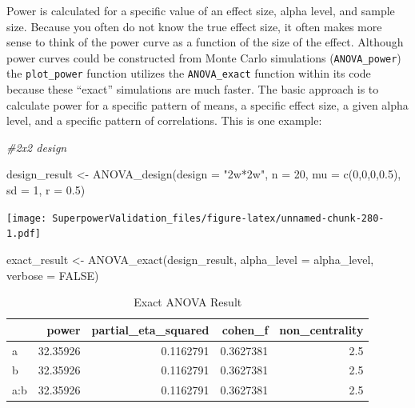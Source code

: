\documentclass[
]{book}
\newenvironment{Shaded}{\begin{snugshade}}{\end{snugshade}}
\newcommand{\AttributeTok}[1]{\textcolor[rgb]{0.77,0.63,0.00}{#1}}
\newcommand{\CommentTok}[1]{\textcolor[rgb]{0.56,0.35,0.01}{\textit{#1}}}
\newcommand{\ConstantTok}[1]{\textcolor[rgb]{0.00,0.00,0.00}{#1}}
\newcommand{\DecValTok}[1]{\textcolor[rgb]{0.00,0.00,0.81}{#1}}
\newcommand{\FloatTok}[1]{\textcolor[rgb]{0.00,0.00,0.81}{#1}}
\newcommand{\FunctionTok}[1]{\textcolor[rgb]{0.00,0.00,0.00}{#1}}
\newcommand{\NormalTok}[1]{#1}
\newcommand{\OtherTok}[1]{\textcolor[rgb]{0.56,0.35,0.01}{#1}}
\newcommand{\StringTok}[1]{\textcolor[rgb]{0.31,0.60,0.02}{#1}}
\begin{document}
Power is calculated for a specific value of an effect size, alpha level, and sample size. Because you often do not know the true effect size, it often makes more sense to think of the power curve as a function of the size of the effect. Although power curves could be constructed from Monte Carlo simulations (\texttt{ANOVA\_power}) the \texttt{plot\_power} function utilizes the \texttt{ANOVA\_exact} function within its code because these ``exact'' simulations are much faster. The basic approach is to calculate power for a specific pattern of means, a specific effect size, a given alpha level, and a specific pattern of correlations. This is one example:

\begin{Shaded}
\begin{Highlighting}[]
\CommentTok{\#2x2 design}

\NormalTok{design\_result }\OtherTok{\textless{}{-}} \FunctionTok{ANOVA\_design}\NormalTok{(}\AttributeTok{design =} \StringTok{"2w*2w"}\NormalTok{,}
                              \AttributeTok{n =} \DecValTok{20}\NormalTok{, }
                              \AttributeTok{mu =} \FunctionTok{c}\NormalTok{(}\DecValTok{0}\NormalTok{,}\DecValTok{0}\NormalTok{,}\DecValTok{0}\NormalTok{,}\FloatTok{0.5}\NormalTok{), }
                              \AttributeTok{sd =} \DecValTok{1}\NormalTok{, }
                              \AttributeTok{r =} \FloatTok{0.5}\NormalTok{)}
\end{Highlighting}
\end{Shaded}

\texttt{[image: SuperpowerValidation\_files/figure-latex/unnamed-chunk-280-1.pdf]}

\begin{Shaded}
\begin{Highlighting}[]
\NormalTok{exact\_result }\OtherTok{\textless{}{-}} \FunctionTok{ANOVA\_exact}\NormalTok{(design\_result,}
                            \AttributeTok{alpha\_level =}\NormalTok{ alpha\_level,}
                            \AttributeTok{verbose =} \ConstantTok{FALSE}\NormalTok{)}
\end{Highlighting}
\end{Shaded}

\begin{table}[!h]

\caption{\label{tab:unnamed-chunk-281}Exact ANOVA Result}
\centering
\begin{tabular}[t]{l|r|r|r|r}
\hline
  & power & partial\_eta\_squared & cohen\_f & non\_centrality\\
\hline
a & 32.35926 & 0.1162791 & 0.3627381 & 2.5\\
\hline
b & 32.35926 & 0.1162791 & 0.3627381 & 2.5\\
\hline
a:b & 32.35926 & 0.1162791 & 0.3627381 & 2.5\\
\hline
\end{tabular}
\end{table}
\pagebreak
\end{document}
